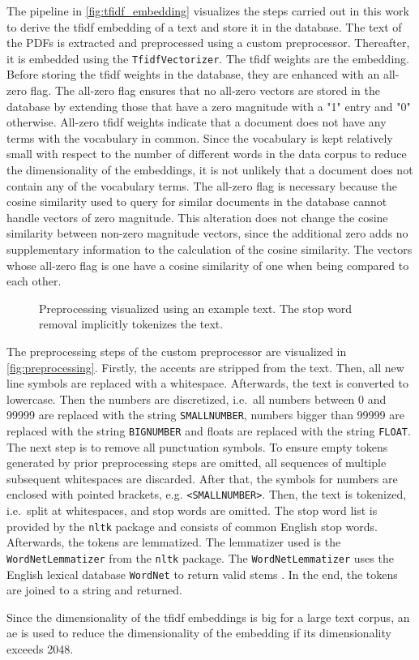 The pipeline in \autoref{fig:tfidf_embedding} visualizes the steps carried out in this work 
to derive the \ac{tfidf} embedding of a text and store it in the database.
The text of the PDFs is extracted and preprocessed using a custom preprocessor.
Thereafter, it is embedded using the \texttt{TfidfVectorizer}.
The \ac{tfidf} weights are the embedding.
Before storing the \ac{tfidf} weights in the database, they are enhanced with an all-zero flag.
The all-zero flag ensures that no all-zero vectors are stored in the database by extending those that have a zero magnitude with a "1" entry and "0" otherwise.
All-zero \ac{tfidf} weights indicate that a document does not have any terms with the vocabulary in common.
Since the vocabulary is kept relatively small with respect to the number of different words in the data corpus to reduce the dimensionality of the embeddings, 
it is not unlikely that a document does not contain any of the vocabulary terms.
The all-zero flag is necessary because the cosine similarity used to query for similar documents in the database cannot handle vectors of zero magnitude.
This alteration does not change the cosine similarity between non-zero magnitude vectors, 
since the additional zero adds no supplementary information to the calculation of the cosine similarity.
The vectors whose all-zero flag is one have a cosine similarity of one when being compared to each other.


\begin{figure}[!htb] %
    \centering
    
    \caption[Preprocessing]{Preprocessing visualized using an example text.
    The stop word removal implicitly tokenizes the text.}
    \label{fig:preprocessing}
\end{figure}

The preprocessing steps of the custom preprocessor are visualized in \autoref{fig:preprocessing}.
Firstly, the accents are stripped from the text.
Then, all new line symbols are replaced with a whitespace.
Afterwards, the text is converted to lowercase.
Then the numbers are discretized, i.e.\ all numbers between 0 and 99999 are replaced with the string \texttt{SMALLNUMBER}, 
numbers bigger than 99999 are replaced with the string \texttt{BIGNUMBER} and floats are replaced with the string \texttt{FLOAT}.
The next step is to remove all punctuation symbols.
To ensure empty tokens generated by prior preprocessing steps are omitted, 
all sequences of multiple subsequent whitespaces are discarded.
After that, the symbols for numbers are enclosed with pointed brackets, e.g. \texttt{<SMALLNUMBER>}.
Then, the text is tokenized, i.e.\ split at whitespaces, and stop words are omitted.
The stop word list is provided by the \texttt{nltk} package 
and consists of common English stop words.
Afterwards, the tokens are lemmatized.
The lemmatizer used is the \texttt{WordNetLemmatizer} from the \texttt{nltk} package.
The \texttt{WordNetLemmatizer} uses the English lexical database \texttt{WordNet} to return valid stems \cite{nltk-lemma-wordnet}.
In the end, the tokens are joined to a string and returned.

Since the dimensionality of the \ac{tfidf} embeddings is big for a large text corpus, 
an \ac{ae} is used to reduce the dimensionality of the embedding if its dimensionality exceeds 2048.